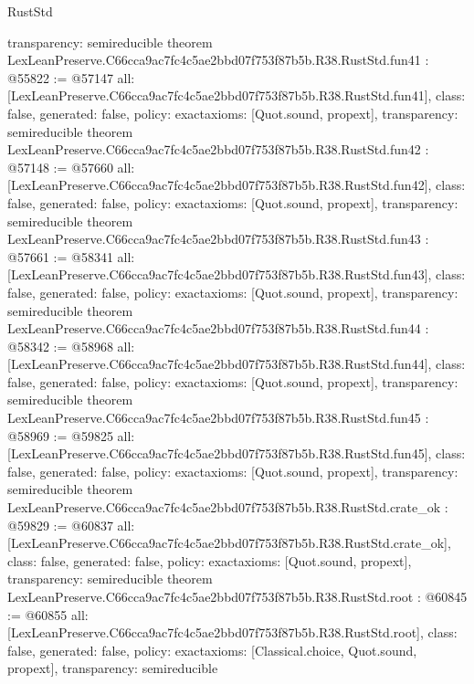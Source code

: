 \begin{lexlean}{RustStd}
\begin{coremodule}
{  transparency: semireducible
}
theorem LexLeanPreserve.C66cca9ac7fc4c5ae2bbd07f753f87b5b.R38.RustStd.fun41 : @55822 := @57147 {
  all: [LexLeanPreserve.C66cca9ac7fc4c5ae2bbd07f753f87b5b.R38.RustStd.fun41],
  class: false,
  generated: false,
  policy: exact{axioms: [Quot.sound, propext]},
  transparency: semireducible
}
theorem LexLeanPreserve.C66cca9ac7fc4c5ae2bbd07f753f87b5b.R38.RustStd.fun42 : @57148 := @57660 {
  all: [LexLeanPreserve.C66cca9ac7fc4c5ae2bbd07f753f87b5b.R38.RustStd.fun42],
  class: false,
  generated: false,
  policy: exact{axioms: [Quot.sound, propext]},
  transparency: semireducible
}
theorem LexLeanPreserve.C66cca9ac7fc4c5ae2bbd07f753f87b5b.R38.RustStd.fun43 : @57661 := @58341 {
  all: [LexLeanPreserve.C66cca9ac7fc4c5ae2bbd07f753f87b5b.R38.RustStd.fun43],
  class: false,
  generated: false,
  policy: exact{axioms: [Quot.sound, propext]},
  transparency: semireducible
}
theorem LexLeanPreserve.C66cca9ac7fc4c5ae2bbd07f753f87b5b.R38.RustStd.fun44 : @58342 := @58968 {
  all: [LexLeanPreserve.C66cca9ac7fc4c5ae2bbd07f753f87b5b.R38.RustStd.fun44],
  class: false,
  generated: false,
  policy: exact{axioms: [Quot.sound, propext]},
  transparency: semireducible
}
theorem LexLeanPreserve.C66cca9ac7fc4c5ae2bbd07f753f87b5b.R38.RustStd.fun45 : @58969 := @59825 {
  all: [LexLeanPreserve.C66cca9ac7fc4c5ae2bbd07f753f87b5b.R38.RustStd.fun45],
  class: false,
  generated: false,
  policy: exact{axioms: [Quot.sound, propext]},
  transparency: semireducible
}
theorem LexLeanPreserve.C66cca9ac7fc4c5ae2bbd07f753f87b5b.R38.RustStd.crate_ok : @59829 := @60837 {
  all: [LexLeanPreserve.C66cca9ac7fc4c5ae2bbd07f753f87b5b.R38.RustStd.crate_ok],
  class: false,
  generated: false,
  policy: exact{axioms: [Quot.sound, propext]},
  transparency: semireducible
}
theorem LexLeanPreserve.C66cca9ac7fc4c5ae2bbd07f753f87b5b.R38.RustStd.root : @60845 := @60855 {
  all: [LexLeanPreserve.C66cca9ac7fc4c5ae2bbd07f753f87b5b.R38.RustStd.root],
  class: false,
  generated: false,
  policy: exact{axioms: [Classical.choice, Quot.sound, propext]},
  transparency: semireducible
}


\end{coremodule}
\end{lexlean}
